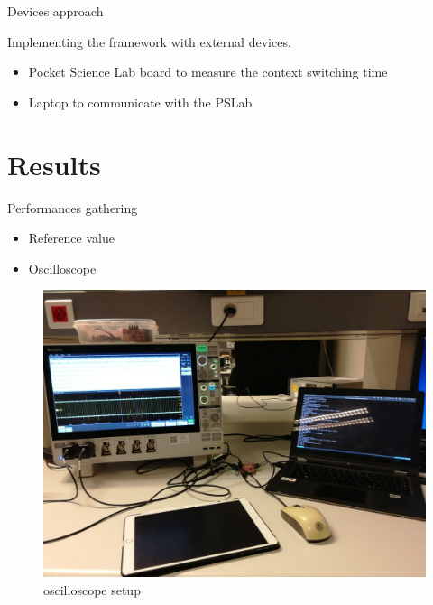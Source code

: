 \documentclass{beamer}
\begin{document}
\begin{frame}{Devices approach}

Implementing the framework with external devices.

\begin{itemize}
\tightlist
\item
  Pocket Science Lab board to measure the context switching time
\item
  Laptop to communicate with the PSLab
\end{itemize}

\end{frame}


\hypertarget{results}{%
\section{Results}\label{results}}


\begin{frame}{Performances gathering}
\protect\hypertarget{performances-gathering}{}

\begin{itemize}
\tightlist
\item
  Reference value
\item
  Oscilloscope
\end{itemize}

\end{frame}


\begin{frame}

\begin{figure}
\centering
\includegraphics[scale=0.1]{assets/1.jpg}
\caption{oscilloscope setup}
\end{figure}

\end{frame}
\end{document}
